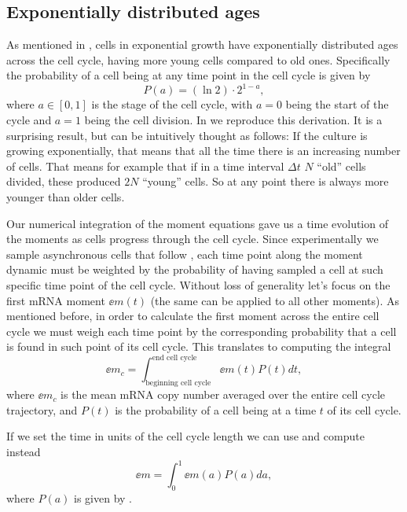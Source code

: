 \subsection{Exponentially distributed ages}

As mentioned in , cells in exponential growth have
exponentially distributed ages across the cell cycle, having more young cells
compared to old ones. Specifically the probability of a cell being at any time
point in the cell cycle is given by \cite{Powell1956}
\begin{equation}
  P(a) = (\ln 2) \cdot 2^{1 - a},
  \label{seq_age_prob}
\end{equation}
where $a \in [0, 1]$ is the stage of the cell cycle, with $a = 0$ being the
start of the cycle and $a = 1$ being the cell division. In
 we reproduce this derivation. It is a surprising
result, but can be intuitively thought as follows: If the culture is growing
exponentially, that means that all the time there is an increasing number of
cells. That means for example that if in a time interval $\Delta t$ $N$ ``old''
cells divided, these produced $2N$ ``young'' cells. So at any point there is
always more younger than older cells.

Our numerical integration of the moment equations gave us a time evolution of
the moments as cells progress through the cell cycle. Since experimentally we
sample asynchronous cells that follow , each time point along
the moment dynamic must be weighted by the probability of having sampled a cell
at such specific time point of the cell cycle. Without loss of generality let's
focus on the first mRNA moment $\ee{m(t)}$ (the same can be applied to all other
moments). As mentioned before, in order to calculate the first moment across the
entire cell cycle we must weigh each time point by the corresponding probability
that a cell is found in such point of its cell cycle. This translates to
computing the integral
\begin{equation}
  \ee{m}_c = \int_{\text{beginning cell cycle}}^{\text{end cell cycle}}
                       \ee{m(t)} P(t) dt,
\end{equation}
where $\ee{m}_c$ is the mean mRNA copy number averaged over the entire cell
cycle trajectory, and $P(t)$ is the probability of a cell being at a time $t$ of
its cell cycle.

If we set the time in units of the cell cycle length we can use
 and compute instead
\begin{equation}
  \ee{m} = \int_0^1 \ee{m(a)} P(a) da,
  \label{seq_moment_avg}
\end{equation}
where $P(a)$ is given by .

